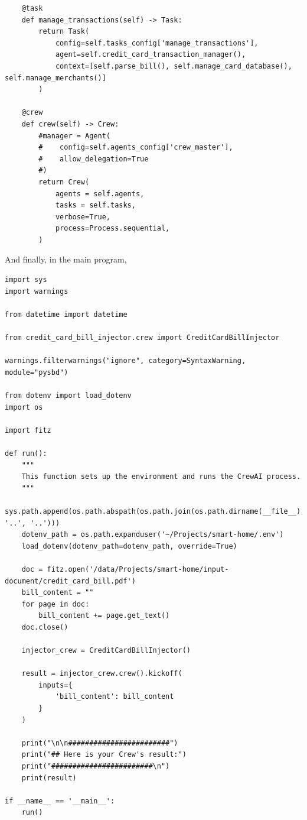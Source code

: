\begin{lstlisting}
    @task
    def manage_transactions(self) -> Task:
        return Task(
            config=self.tasks_config['manage_transactions'],
            agent=self.credit_card_transaction_manager(),
            context=[self.parse_bill(), self.manage_card_database(), self.manage_merchants()]
        )

    @crew
    def crew(self) -> Crew:
        #manager = Agent(
        #    config=self.agents_config['crew_master'],
        #    allow_delegation=True
        #)
        return Crew(
            agents = self.agents,
            tasks = self.tasks,
            verbose=True,
            process=Process.sequential,
        )
\end{lstlisting}

And finally, in the main program,

\begin{lstlisting}
import sys
import warnings

from datetime import datetime

from credit_card_bill_injector.crew import CreditCardBillInjector

warnings.filterwarnings("ignore", category=SyntaxWarning, module="pysbd")

from dotenv import load_dotenv
import os

import fitz

def run():
    """
    This function sets up the environment and runs the CrewAI process.
    """
    sys.path.append(os.path.abspath(os.path.join(os.path.dirname(__file__), '..', '..')))
    dotenv_path = os.path.expanduser('~/Projects/smart-home/.env')
    load_dotenv(dotenv_path=dotenv_path, override=True)

    doc = fitz.open('/data/Projects/smart-home/input-document/credit_card_bill.pdf')
    bill_content = ""
    for page in doc:
        bill_content += page.get_text()
    doc.close()

    injector_crew = CreditCardBillInjector()

    result = injector_crew.crew().kickoff(
        inputs={
            'bill_content': bill_content
        }
    )

    print("\n\n########################")
    print("## Here is your Crew's result:")
    print("########################\n")
    print(result)

if __name__ == '__main__':
    run()
\end{lstlisting}

